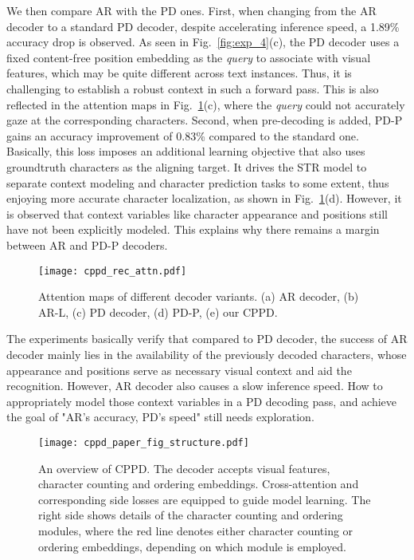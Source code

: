 \documentclass[10pt,journal,compsoc]{IEEEtran}
\begin{document}
We then compare AR with the PD ones. First, when changing from the AR decoder to a standard PD decoder, despite accelerating inference speed, a 1.89\% accuracy drop is observed. As seen in Fig.~\ref{fig:exp_4}(c), the PD decoder uses a fixed content-free position embedding as the \emph{query} to associate with visual features, which may be quite different across text instances. Thus, it is challenging to establish a robust context in such a forward pass. This is also reflected in the attention maps in Fig.~\ref{fig:vis1}(c), where the \emph{query} could not accurately gaze at the corresponding characters. Second, when pre-decoding is added, PD-P gains an accuracy improvement of 0.83\% compared to the standard one. Basically, this loss imposes an additional learning objective that also uses groundtruth characters as the aligning target. It drives the STR model to separate context modeling and character prediction tasks to some extent, thus enjoying more accurate character localization, as shown in Fig.~\ref{fig:vis1}(d). However, it is observed that context variables like character appearance and positions still have not been explicitly modeled. This explains why there remains a margin between AR and PD-P decoders.

\begin{figure}[t] 
\centering
\texttt{[image: cppd\_rec\_attn.pdf]}  
\caption{Attention maps of different decoder variants. (a) AR decoder, (b) AR-L, (c) PD decoder, (d) PD-P, (e) our CPPD.}  
\label{fig:vis1}  
\end{figure}

The experiments basically verify that compared to PD decoder, the success of AR decoder mainly lies in the availability of the previously decoded characters, whose appearance and positions serve as necessary visual context and aid the recognition. However, AR decoder also causes a slow inference speed. How to appropriately model those context variables in a PD decoding pass, and achieve the goal of "AR's accuracy, PD's speed" still needs exploration. 


\begin{figure*}[ht]  
\centering  
\texttt{[image: cppd\_paper\_fig\_structure.pdf]}  
\caption{An overview of CPPD. The decoder accepts visual features, character counting and ordering embeddings. Cross-attention and corresponding side losses are equipped to guide model learning. The right side shows details of the character counting and ordering modules, where the red line denotes either character counting or ordering embeddings, depending on which module is employed.} 
\label{fig:structrue}  
\end{figure*}
\end{document}
